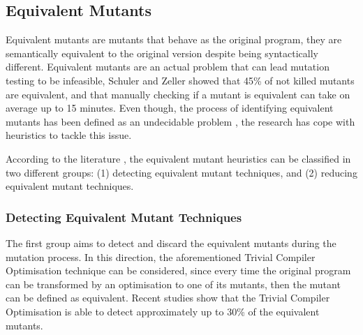 
\subsection{Equivalent Mutants}
\label{sec:opt:equivalent}

Equivalent mutants are mutants that behave as the original program, they are semantically equivalent to the original version despite being syntactically different. Equivalent mutants are an actual problem that can lead mutation testing to be infeasible, Schuler and Zeller \cite{schuler2013covering} showed that 45\% of not killed mutants are equivalent, and that manually checking if a mutant is equivalent can take on average up to 15 minutes. Even though, the process of identifying equivalent mutants has been defined as an undecidable problem \cite{madeyski2013overcoming}, the research has cope with heuristics to tackle this issue.

According to the literature \cite{madeyski2013overcoming}, the equivalent mutant heuristics can be classified in two different groups: (1) detecting equivalent mutant techniques, and (2) reducing equivalent mutant techniques.

\subsubsection{Detecting Equivalent Mutant Techniques}

The first group aims to detect and discard the equivalent mutants during the mutation process. In this direction, the aforementioned Trivial Compiler Optimisation \cite{papadakis2015trivial, kintis2017detecting,papadakis2019mutation} technique can be considered, since every time the original program can be transformed by an optimisation to one of its mutants, then the mutant can be defined as equivalent. Recent studies \cite{papadakis2015trivial} show that the Trivial Compiler Optimisation is able to detect approximately up to 30\% of the equivalent mutants.

